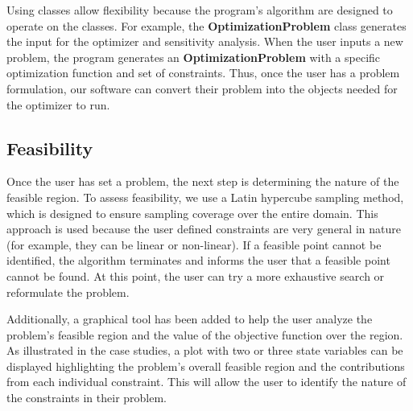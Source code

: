 \documentclass[10pt]{article}
\begin{document}
Using classes allow flexibility because the program's algorithm are designed to operate on the classes.  For example, the \textbf{OptimizationProblem} class generates the input for the optimizer and sensitivity analysis.  When the user inputs a new problem, the program generates an \textbf{OptimizationProblem} with a specific optimization function and set of constraints.  Thus, once the user has a problem formulation, our software can convert their problem into the objects needed for the optimizer to run.

\subsection{Feasibility}
\label{subsec:Feasibility}

Once the user has set a problem, the next step is determining the nature of the feasible region.  To assess feasibility, we use a Latin hypercube sampling method, which is designed to ensure sampling coverage over the entire domain.  This approach is used because the user defined constraints are very general in nature (for example, they can be linear or non-linear).  If a feasible point cannot be identified, the algorithm terminates and informs the user that a feasible point cannot be found.  At this point, the user can try a more exhaustive search or reformulate the problem.

Additionally, a graphical tool has been added to help the user analyze the problem's feasible region and the value of the objective function over the region.  As illustrated in the case studies, a plot with two or three state variables can be displayed highlighting the problem's overall feasible region and the contributions from each individual constraint.  This will allow the user to identify the nature of the constraints in their problem.

\end{document}
